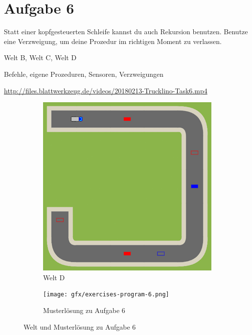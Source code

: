 \pagebreak

\section*{Aufgabe 6}
\label{sec:exercises:6}

Statt einer kopfgesteuerten Schleife kannst du auch Rekursion benutzen. Benutze eine Verzweigung, um deine Prozedur im richtigen Moment zu verlassen.

\begin{description}[noitemsep]
  \item[Welt wählen:] Welt B, Welt C, Welt D
  \item[Du brauchst:] Befehle, eigene Prozeduren, Sensoren, Verzweigungen
  \item[Video:] \url{http://files.blattwerkzeug.de/videos/20180213-Trucklino-Task6.mp4}
\end{description}

\begin{figure}[H]
  \begin{subfigure}[b]{0.40\textwidth}
    \includegraphics[width=\textwidth]{gfx/exercises-world-d.png}
    \caption{Welt D}
  \end{subfigure}\hfill
  \begin{subfigure}[b]{0.40\textwidth}
    \texttt{[image: gfx/exercises-program-6.png]}
    \caption{Musterlösung zu Aufgabe 6}
  \end{subfigure}\hfill
  \caption{Welt und Musterlösung zu Aufgabe 6}
\end{figure}

